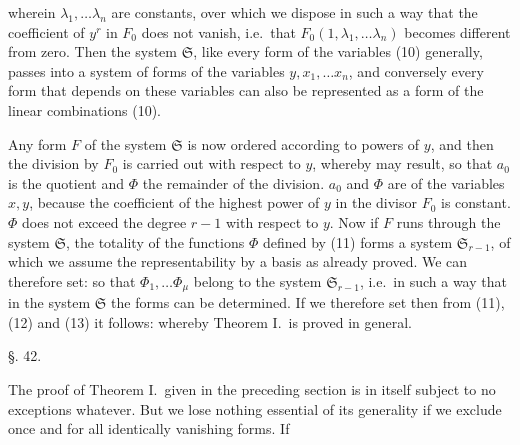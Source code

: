 wherein $\lambda_1,\ldots\lambda_n$ are constants, over which we dispose in such a way that the coefficient of $y^r$ in $F_0$ does not vanish, i.e.\ that $F_0(1,\lambda_1,\ldots\lambda_n)$ becomes different from zero. Then the system $\mathfrak S$, like every form of the variables (10) generally, passes into a system of forms of the variables $y,x_1,\ldots x_n$, and conversely every form that depends on these variables can also be represented as a form of the linear combinations (10).

Any form $F$ of the system $\mathfrak S$ is now ordered according to powers of $y$, and then the division by $F_0$ is carried out with respect to $y$, whereby
may result, so that $a_0$ is the quotient and $\Phi$ the remainder of the division. $a_0$ and $\Phi$ are  of the variables $x, y$, because the coefficient of the highest power of $y$ in the divisor $F_0$ is constant. $\Phi$ does not exceed the degree $r-1$ with respect to $y$. Now if $F$ runs through the system $\mathfrak S$, the totality of the functions $\Phi$ defined by (11) forms a system $\mathfrak S_{r-1}$, of which we assume the representability by a basis as already proved. We can therefore set:
so that $\Phi_1,\ldots\Phi_\mu$ belong to the system $\mathfrak S_{r-1}$, i.e.\ in such a way that in the system $\mathfrak S$ the forms
can be determined. If we therefore set
then from (11), (12) and (13) it follows:
whereby Theorem I.\ is proved in general.

\begin{center}
\S. 42.\\
\end{center}

The proof of Theorem I.\ given in the preceding section is in itself subject to no exceptions whatever. But we lose nothing essential of its generality if we exclude once and for all identically vanishing forms. If
